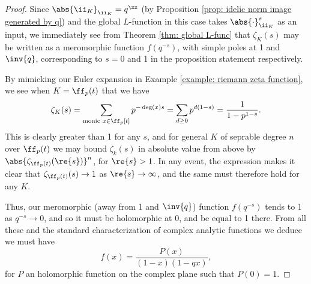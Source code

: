 \documentclass[11pt, x11names, openany]{book}
\begin{document}
\begin{proof}
Since $\abs{\ii_K}_{\ii_K} = q^\zz$ (by Proposition \ref{prop: idelic norm image generated by q}) and the global $L$-function in this case takes $\abs{\cdot}_{\ii_K}^s$ as an input, we immediately see from Theorem \ref{thm: global L-func} that $\zeta_K(s)$ may be written as a meromorphic function $f(q^{-s})$, with simple poles at 1 and $\inv{q}$, corresponding to $s=0$ and 1 in the proposition statement respectively.

By mimicking our Euler expansion in Example \ref{example: riemann zeta function}, we see when $K = \ff_p(t)$ that we have
\begin{equation*}
    \zeta_K(s) = \sum_{\text{monic } x \in \ff_p[t]} p^{- \deg(x) s} = \sum_{d \geq 0} p^{d(1 - s)} = \frac{1}{1 - p^{1-s}}.
\end{equation*}
This is clearly greater than 1 for any $s$, and for general $K$ of seprable degree $n$ over $\ff_p(t)$ we may bound $\zeta_k(s)$ in absolute value from above by $\abs{\zeta_{\ff_p(t)}(\re{s})}^n$, for $\re{s} > 1$. In any event, the expression makes it clear that $\zeta_{\ff_p(t)}(s) \to 1$ as $\re{s} \to \infty$, and the same must therefore hold for any $K$.

Thus, our meromorphic (away from 1 and $\inv{q}$) function $f(q^{-s})$ tends to 1 as $q^{-s} \to 0$, and so it must be holomorphic at 0, and be equal to 1 there. From all these and the standard characterization of complex analytic functions we deduce we must have
\begin{equation*}
    f(x) = \frac{P(x)}{(1 - x)(1-qx)},
\end{equation*}
for $P$ an holomorphic function on the complex plane such that $P(0) = 1$.


\end{proof}
\end{document}
